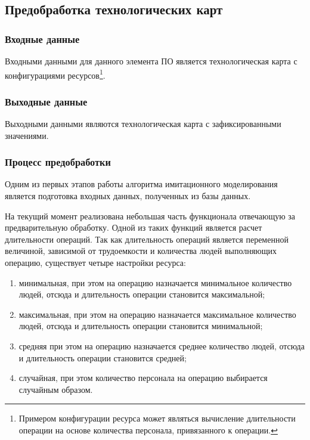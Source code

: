 \subsection{Предобработка технологических карт}

\subsubsection*{Входные данные}
\indent Входными данными для данного элемента ПО является технологическая карта с конфигурациями ресурсов\footnote{Примером конфигурации ресурса может являться вычисление длительности операции на основе количества персонала, привязанного к операции.}. 

\subsubsection*{Выходные данные}
Выходными данными являются технологическая карта с зафиксированными значениями.

\subsubsection*{Процесс предобработки}
\label{prepeocess}
Одним из первых этапов работы алгоритма имитационного моделирования является подготовка входных данных, полученных из базы данных. 

На текущий момент реализована небольшая часть функционала отвечающую за предварительную обработку. Одной из таких функций является расчет длительности операций. Так как длительность операций является переменной величиной, зависимой от трудоемкости и количества людей выполняющих операцию, существует четыре настройки ресурса:

\begin{enumerate}
    \item[1)] минимальная, при этом на операцию назначается минимальное количество людей, отсюда и длительность операции становится максимальной;
    \item[2)] максимальная, при этом на операцию назначается максимальное количество людей, отсюда и длительность операции становится минимальной;
    \item[3)] средняя при этом на операцию назначается среднее количество людей, отсюда и длительность операции становится средней;
    \item[4)] случайная, при этом количество персонала на операцию выбирается случайным образом. 
\end{enumerate}

